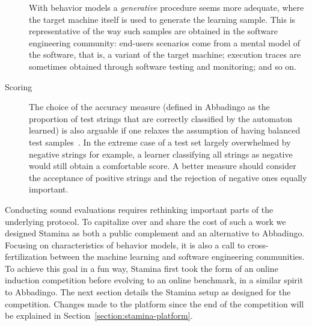 \begin{description}
With behavior models a \emph{generative} procedure seems more adequate, where the target machine itself is used to generate the learning sample. This is representative of the way such samples are obtained in the software engineering community: end-users scenarios come from a mental model of the software, that is, a variant of the target machine; execution traces are sometimes obtained through software testing and monitoring; and so on.

\item[Scoring] The choice of the accuracy measure (defined in Abbadingo as the proportion of test strings that are correctly classified by the automaton learned) is also arguable if one relaxes the assumption of having balanced test samples~\cite{Walkinshaw:2008}. In the extreme case of a test set largely overwhelmed by negative strings for example, a learner classifying all strings as negative would still obtain a comfortable score. A better measure should consider the acceptance of positive strings and the rejection of negative ones equally important. 
\end{description}

Conducting sound evaluations requires rethinking important parts of the underlying protocol. To capitalize over and share the cost of such a work we designed Stamina as both a public complement and an alternative to Abbadingo. Focusing on characteristics of behavior models, it is also a call to cross-fertilization between the machine learning and software engineering communities. To achieve this goal in a fun way, Stamina first took the form of an online induction competition before evolving to an online benchmark, in a similar spirit to Abbadingo. The next section details the Stamina setup as designed for the competition. Changes made to the platform since the end of the competition will be explained in Section~\ref{section:stamina-platform}.
